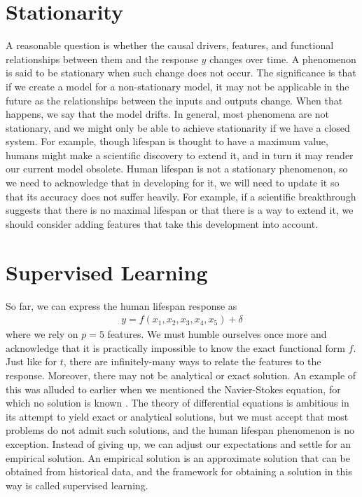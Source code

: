 \documentclass[12pt]{article}
\begin{document}
	\section{Stationarity}
	A reasonable question is whether the causal drivers, features, and functional
	relationships between them and the response $y$ changes over time. A phenomenon
	is said to be stationary when such change does not occur. The significance
	is that if we create a model for a non-stationary model, it may not be applicable
	in the future as the relationships between the inputs and outputs change.
	When that happens, we say that the model drifts. In general, most phenomena
	are not stationary, and we might only be able to achieve stationarity if
	we have a closed system. For example, though lifespan is thought to have
	a maximum value, humans might make a scientific discovery to extend it,
	and in turn it may render our current model obsolete. Human lifespan
	is not a stationary phenomenon, so we need to acknowledge that in developing
	for it, we will need to update it so that its accuracy does not suffer
	heavily. For example, if a scientific breakthrough suggests that there
	is no maximal lifespan or that there is a way to extend it, we should
	consider adding features that take this development into account.
	\section{Supervised Learning}
	So far, we can express the human lifespan response as
	\begin{align*}
		y = f(x_1,x_2,x_3,x_4,x_5)+\delta
	\end{align*}
	where we rely on $p=5$ features. We must humble ourselves once more
	and acknowledge that it is practically impossible to know the exact
	functional form $f$. Just like for $t$, there are infinitely-many ways
	to relate the features to the response. Moreover, there may not be analytical
	or exact solution. An example of this was alluded to
	earlier when we mentioned the Navier-Stokes equation, for which no
	solution is known \cite{Clay-navier-stokes}. The theory of differential
	equations is ambitious in its attempt to yield exact or analytical
	solutions, but we must accept that most problems do not admit such
	solutions, and the human lifespan phenomenon is no exception.
	Instead of giving up, we can adjust our expectations and settle
	for an empirical solution. An empirical solution is an
	approximate solution that can be obtained from historical data, and
	the framework for obtaining a solution in this way is called supervised
	learning.
\end{document}
